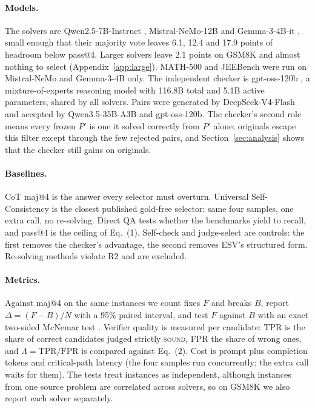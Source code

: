 \documentclass[letterpaper]{article} %
\begin{document}
\paragraph{Models.}
The solvers are Qwen2.5-7B-Instruct \cite{qwen2025qwen25}, Mistral-NeMo-12B and Gemma-3-4B-it \cite{gemma2025gemma3}, small enough that their majority vote leaves 6.1, 12.4 and 17.9 points of headroom below pass@4. Larger solvers leave 2.1 points on GSM8K and almost nothing to select (Appendix~\ref{app:large}). MATH-500 and JEEBench were run on Mistral-NeMo and Gemma-3-4B only. The independent checker is gpt-oss-120b \cite{openai2025gptoss}, a mixture-of-experts reasoning model with 116.8B total and 5.1B active parameters, shared by all solvers. Pairs were generated by DeepSeek-V4-Flash and accepted by Qwen3.5-35B-A3B and gpt-oss-120b. The checker's second role means every frozen $P'$ is one it solved correctly from $P'$ alone; originals escape this filter except through the few rejected pairs, and Section~\ref{sec:analysis} shows that the checker still gains on originals.

\paragraph{Baselines.}
CoT maj@4 \cite{wang2022self} is the answer every selector must overturn. Universal Self-Consistency \cite{chen2023universal} is the closest published gold-free selector: same four samples, one extra call, no re-solving. Direct QA tests whether the benchmarks yield to recall, and pass@4 is the ceiling of Eq.~(1). Self-check and judge-select are controls: the first removes the checker's advantage, the second removes ESV's structured form. Re-solving methods \cite{madaan2023self,shinn2023reflexion} violate R2 and are excluded.

\paragraph{Metrics.}
Against maj@4 on the same instances we count fixes $F$ and breaks $B$, report $\Delta = (F-B)/N$ with a 95\% paired interval, and test $F$ against $B$ with an exact two-sided McNemar test \cite{mcnemar1947}. Verifier quality is measured per candidate: TPR is the share of correct candidates judged strictly \textsc{sound}, FPR the share of wrong ones, and $\Lambda = \mathrm{TPR}/\mathrm{FPR}$ is compared against Eq.~(2). Cost is prompt plus completion tokens and critical-path latency (the four samples run concurrently; the extra call waits for them). The tests treat instances as independent, although instances from one source problem are correlated across solvers, so on GSM8K we also report each solver separately.
\end{document}
